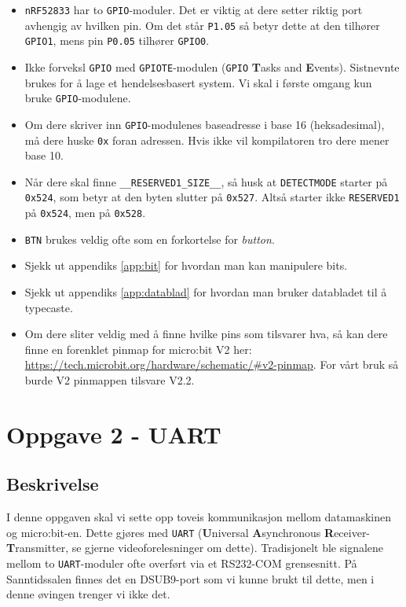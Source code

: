 \begin{itemize}
    \item \verb|nRF52833| har to \verb|GPIO|-moduler. Det er viktig at dere setter riktig port avhengig av hvilken pin. Om det står \verb|P1.05| så betyr dette at den tilhører \verb|GPIO1|, mens pin \verb|P0.05| tilhører \verb|GPIO0|.
    \item Ikke forveksl \verb|GPIO| med \verb|GPIOTE|-modulen (\verb|GPIO| \textbf{T}asks
and \textbf{E}vents). Sistnevnte brukes for å lage et hendelsesbasert system.
Vi skal i første omgang kun bruke \verb|GPIO|-modulene.
    \item Om dere skriver inn \verb|GPIO|-modulenes baseadresse i base 16 (heksadesimal), må dere huske \verb|0x| foran adressen. Hvis ikke vil kompilatoren
    tro dere mener base 10.
    \item Når dere skal finne \verb|__RESERVED1_SIZE__|, så husk at \verb|DETECTMODE| starter på \verb|0x524|, som betyr at den byten slutter på \verb|0x527|. Altså starter ikke \verb|RESERVED1| på \verb|0x524|, men på \verb|0x528|.
    \item \verb|BTN| brukes veldig ofte som en forkortelse for \textit{button}.
    \item Sjekk ut appendiks \ref{app:bit} for hvordan man kan manipulere bits.
    \item Sjekk ut appendiks \ref{app:datablad} for hvordan man bruker databladet til å typecaste.
    \item Om dere sliter veldig med å finne hvilke pins som tilsvarer hva, så kan dere finne en forenklet pinmap for micro:bit V2 her: \href{https://tech.microbit.org/hardware/schematic/#v2-pinmap}{https://tech.microbit.org/\newline hardware/schematic/\#v2-pinmap}. For vårt bruk så burde V2 pinmappen tilsvare V2.2.

\end{itemize}

\section{Oppgave 2 - UART}\label{sec:4-oppgave-UART}

\subsection{Beskrivelse}

I denne oppgaven skal vi sette opp toveis kommunikasjon mellom datamaskinen og micro:bit-en. Dette gjøres med \verb|UART| (\textbf{U}niversal \textbf{A}synchronous \textbf{R}eceiver-\textbf{T}ransmitter, se gjerne videoforelesninger om dette). Tradisjonelt ble signalene mellom to \verb|UART|-moduler ofte overført via et RS232-COM grensesnitt. På Sanntidssalen finnes det en DSUB9-port som vi kunne brukt til dette, men i denne øvingen trenger vi ikke det. 

